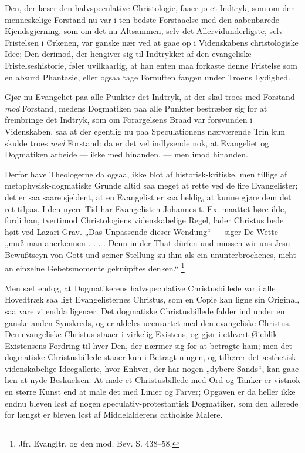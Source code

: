 \documentclass[12pt,a4paper]{book}
\newcommand{\opage}[1]{\marginnote{\footnotesize\textit{[#1]}}}
\begin{document}
Den, der læser den halvspeculative Christologie, faaer jo et Indtryk, som
om den menneskelige Forstand nu var i ten bedste Forstaaelse med den
aabenbarede Kjendsgjerning, som om det nu Altsammen, selv det
Allervidunderligste, selv Fristelsen i Ørkenen, var ganske nær ved at gaae
op i Videnskabens christologiske Idee; Den derimod, der hengiver sig til
Indtrykket af den evangeliske Fristelseshistorie, føler uvilkaarlig, at han
enten maa forkaste
\opage{108} denne Fristelse som en absurd Phantasie, eller ogsaa tage Fornuften fangen
under Troens Lydighed.

Gjør nu Evangeliet paa alle Punkter det Indtryk, at der skal troes med
Forstand \emph{mod} Forstand, medens Dogmatiken paa alle Punkter bestræber
sig for at frembringe det Indtryk, som om Forargelsens Braad var forsvunden
i Videnskaben, saa at der egentlig nu paa Speculationens nærværende Trin
kun skulde troes \emph{med} Forstand: da er det vel indlysende nok, at
Evangeliet og Dogmatiken arbeide --- ikke med hinanden, --- men imod
hinanden.

Derfor have Theologerne da ogsaa, ikke blot af historisk-kritiske, men
tillige af metaphysisk-dogmatiske Grunde altid saa meget at rette ved de
fire Evangelister; det er saa saare sjeldent, at en Evangelist er saa
heldig, at kunne gjøre dem det ret tilpas. I den nyere Tid har Evangelisten
Johannes t. Ex. maattet høre ilde, fordi han, tvertimod Christologiens
videnskabelige Regel, lader Christus bede høit ved Lazari Grav. „Das
Unpassende dieser Wendung“ --- siger De Wette --- „muß man anerkennen . . .
. Denn in der That dürfen und müssen wir uns Jesu Bewußtseyn von Gott und
seiner Stellung zu ihm als ein ununterbrochenes, nicht an einzelne
Gebetsmomente geknüpftes denken.“%
\footnote{Jfr. Evangltr. og den mod. Bev. S. 438--58.}

Men sæt endog, at Dogmatikerens halvspeculative Christusbillede var i alle
Hovedtræk saa ligt Evangelisternes Christus, som en Copie kan ligne sin
Original, saa vare vi endda ligenær. Det dogmatiske Christusbillede falder
ind under en ganske anden Synskreds, og er aldeles ueensartet med den
evangeliske Christus. Den evangeliske Christus staaer i virkelig Existens,
og gjør i ethvert Øieblik Existensens Fordring til hver Den, der nærmer sig
for at betragte ham; men det dogmatiske Christusbillede staaer kun i
Betragt\-%
\opage{109}ningen, og tilhører det æsthetisk-videnskabelige Ideegallerie, hvor Enhver,
der har nogen „dybere Sands“, kan gaae hen at nyde Beskuelsen. At male et
Christusbillede med Ord og Tanker er vistnok en større Kunst end at male
det med Linier og Farver; Opgaven er da heller ikke endnu bleven løst af
nogen speculativ-protestantisk Dogmatiker, som den allerede for længst er
bleven løst af Middelalderens catholske Malere.
\end{document}
